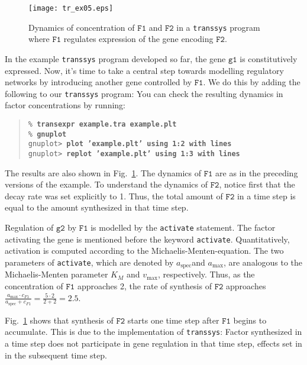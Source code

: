 \documentclass[12pt]{article}
\newcommand{\transsys}{\texttt{transsys}}
\newcommand{\codeword}[1]{\texttt{#1}}
\newcommand{\amax}{\ensuremath{a_{\mathrm{max}}}}
\newcommand{\aspec}{\ensuremath{a_{\mathrm{spec}}}}
\newcommand{\factorsym}[1]{\ensuremath{\mathtt{#1}}}
\newcommand{\factorconc}[1]{\ensuremath{c_{#1}}}
\newcommand{\genesym}[1]{\ensuremath{\mathtt{#1}}}
\newcommand{\cmdline}[2][\% ]{\texttt{#1\textbf{#2}}}
\begin{document}
\begin{figure}
\centerline{\texttt{[image: tr\_ex05.eps]}}
\caption{\label{fig_twofactors}
  Dynamics of concentration of \factorsym{F1} and \factorsym{F2} in a
  \transsys{} program where \factorsym{F1} regulates expression of the
  gene encoding \factorsym{F2}.
}
\end{figure}
In the example \transsys{} program developed so far, the gene
\genesym{g1} is constitutively expressed. Now, it's time to take a
central step towards modelling regulatory networks by introducing
another gene controlled by \factorsym{F1}. We do this by adding the
following to our \transsys{} program:
You can check the resulting dynamics in factor concentrations by
running:
\begin{quote}
\cmdline{transexpr example.tra example.plt} \\
\cmdline{gnuplot} \\
\cmdline[gnuplot> ]{plot 'example.plt' using 1:2 with lines} \\
\cmdline[gnuplot> ]{replot 'example.plt' using 1:3 with lines}
\end{quote}
The results are also shown in Fig.\ \ref{fig_twofactors}. The dynamics
of \factorsym{F1} are as in the preceding versions of the example. To
understand the dynamics of \factorsym{F2}, notice first that the decay
rate was set explicitly to 1. Thus, the total amount of \factorsym{F2}
in a time step is equal to the amount synthesized in that time step.

Regulation of \genesym{g2} by \factorsym{F1} is modelled by the
\codeword{activate} statement. The factor activating the gene is
mentioned before the keyword \codeword{activate}. Quantitatively,
activation is computed according to the Michaelis-Menten-equation. The
two parameters of \codeword{activate}, which are denoted by \aspec and
\amax, are analogous to the Michaelis-Menten parameter $K_M$ and
$v_{\mathrm{max}}$, respectively. Thus, as the concentration of
\factorsym{F1} approaches 2, the rate of synthesis of \factorsym{F2}
approaches $\frac{\amax \cdot \factorconc{F1}}{\aspec +
  \factorconc{F1}} = \frac{5 \cdot 2}{2 + 2} = 2.5$.

Fig.\ \ref{fig_twofactors} shows that synthesis of \factorsym{F2}
starts one time step after \factorsym{F1} begins to accumulate. This
is due to the implementation of \transsys{}: Factor synthesized in a
time step does not participate in gene regulation in that time step,
effects set in in the subsequent time step.
\end{document}
